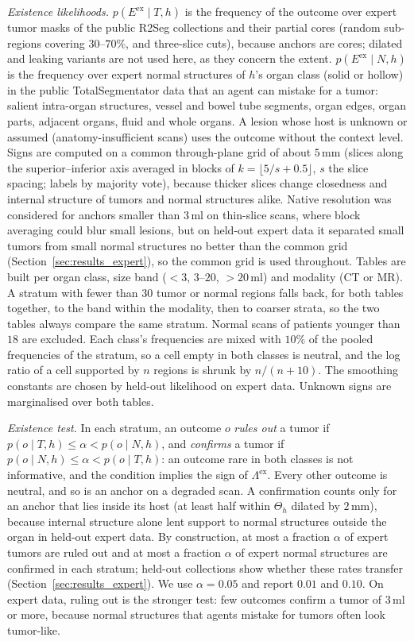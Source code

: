 \documentclass[fleqn,10pt]{olplainarticle}
\begin{document}
\emph{Existence likelihoods.} $p(E^{\mathrm{ex}}\mid T,h)$ is the frequency of the outcome over expert tumor masks of the
public R2Seg collections and their partial cores (random sub-regions covering $30$--$70\%$, and three-slice cuts), because
anchors are cores; dilated and leaking variants are not used here, as they concern the extent. $p(E^{\mathrm{ex}}\mid N,h)$ is
the frequency over expert normal structures of $h$'s organ class (solid or hollow) in the public TotalSegmentator data that
an agent can mistake for a tumor: salient intra-organ structures, vessel and bowel tube segments, organ edges, organ parts,
adjacent organs, fluid and whole organs. A lesion whose host is unknown or assumed (anatomy-insufficient scans) uses the outcome without the context level. Signs are computed on a
common through-plane grid of about $5$\,mm (slices along the superior--inferior axis averaged in blocks of
$k=\lfloor5/s+0.5\rfloor$, $s$ the slice spacing; labels by majority vote), because thicker slices change closedness and
internal structure of tumors and normal structures alike. Native resolution was considered for anchors smaller than $3$\,ml
on thin-slice scans, where block averaging could blur small lesions, but on held-out expert data it separated small tumors
from small normal structures no better than the common grid (Section~\ref{sec:results_expert}), so the common grid is used
throughout. Tables are built per organ class, size band ($<3$, $3$--$20$, $>20$\,ml) and
modality (CT or MR). A stratum with fewer than $30$ tumor or normal regions falls back, for both tables together, to the band
within the modality, then to coarser strata, so the two tables always compare the same stratum. Normal scans of patients
younger than $18$ are excluded. Each class's frequencies are mixed with $10\%$ of the pooled frequencies of the stratum, so a
cell empty in both classes is neutral, and the log ratio of a cell supported by $n$ regions is shrunk by $n/(n+10)$. The smoothing constants are chosen by held-out likelihood on expert
data. Unknown signs are marginalised over both tables.

\emph{Existence test.} In each stratum, an outcome $o$ \emph{rules out} a tumor if $p(o\mid T,h)\le\alpha<p(o\mid N,h)$,
and \emph{confirms} a tumor if $p(o\mid N,h)\le\alpha<p(o\mid T,h)$: an outcome rare in both classes is not informative,
and the condition implies the sign of $\Lambda^{\mathrm{ex}}$. Every other outcome is neutral, and so is an anchor on a degraded scan. A confirmation counts only for an anchor that lies inside
its host (at least half within $\Theta_h$ dilated by $2$\,mm), because internal structure alone lent support to normal
structures outside the organ in held-out expert data. By construction, at most a fraction $\alpha$ of expert tumors are
ruled out and at most a fraction $\alpha$ of expert normal structures are confirmed in each stratum; held-out collections
show whether these rates transfer (Section~\ref{sec:results_expert}). We use $\alpha=0.05$ and report $0.01$ and $0.10$.
On expert data, ruling out is the stronger test: few outcomes confirm a tumor of $3$\,ml or more, because normal structures
that agents mistake for tumors often look tumor-like.
\end{document}

